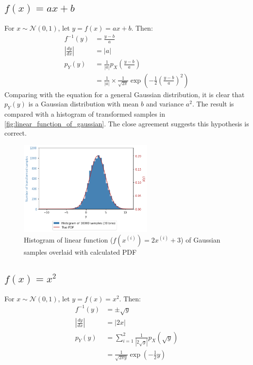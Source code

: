 \documentclass[a4paper]{article}
\begin{document}
\subsection{$f(x) = a x + b$}
For $x \sim \mathcal{N}(0, 1)$, let $y = f(x) = a x + b$. Then:
\begin{align*}
    f^{-1}(y) &= \frac{y - b}{a} \\
    \left|\frac{dy}{dx}\right| &= |a| \\
    p_Y(y) &= \frac{1}{|a|} p_X \left( \frac{y - b}{a} \right) \\
    &= \frac{1}{|a|}\times\frac{1}{\sqrt{2\pi}} \exp{\left( -\frac{1}{2} \left( \frac{y-b}{a} \right)^2 \right)}
\end{align*}
Comparing with the equation for a general Gaussian distribution, it is clear that $p_Y(y)$ is a Gaussian distribution
with mean $b$ and variance $a^2$.
The result is compared with a histogram of transformed samples in \autoref{fig:linear_function_of_gaussian}. The close
agreement suggests this hypothesis is correct.

\begin{figure}[h]
    \centering
    \includegraphics[width=0.6\textwidth]{figures/linear_function_of_gaussian.png}
    \caption{Histogram of linear function ($f(x^{(i)}) = 2x^{(i)} + 3$) of Gaussian samples overlaid with
    calculated PDF}
    \label{fig:linear_function_of_gaussian}
\end{figure}


\subsection{$f(x) = x^2$}
For $x \sim \mathcal{N}(0, 1)$, let $y = f(x) = x ^ 2$. Then:
\begin{align*}
    f^{-1}(y) &= \pm \sqrt{y} \\
    \left|\frac{dy}{dx}\right| &= |2x| \\
    p_Y(y) &= \sum_{i=1}^{2} \frac{1}{|2 \sqrt{y}|} p_X \left( \sqrt{y} \right) \\
    &= \frac{1}{\sqrt{2\pi y}} \exp{\left( -\frac{1}{2} y \right)}
\end{align*}
\end{document}
